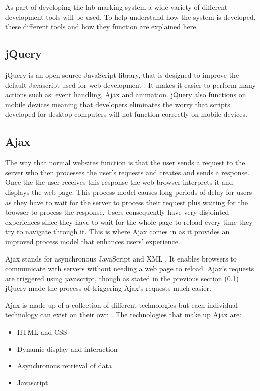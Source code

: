 \documentclass[11pt]{report}
\begin{document}
As part of developing the lab marking system  a wide variety of different development tools will be used. To help understand how the system is developed, these different tools and how they function are explained here.  



\subsection{jQuery} \label{sec:jquery}
jQuery is an open source JavaScript library, that is designed to improve the default Javascript used for web development \cite{jquery.org_jquery_????-1}. It makes it easier to perform many actions such as: event handling, Ajax and animation. jQuery also functions on mobile devices meaning that developers eliminates the worry that scripts developed for desktop computers will not function correctly on mobile devices.  

\subsection{Ajax}
The way that normal websites function is that the user sends a request to the server who then processes the user's requests and creates and sends a response. Once the the user receives this response the web browser interprets it and displays the web page\cite{smith_simplifying_2006-1}. This process model causes long periods of delay for users as they have to wait for the server to process their request plus waiting for the browser to process the response. Users consequently have very disjointed experiences since they have to wait for the whole page to reload every time they try to navigate through it. This is where Ajax comes in as it provides an improved process model that enhances users' experience.  

 Ajax stands for asynchronous JavaScript and XML \cite{jquery.org_ajax_????}. It enables browsers to communicate with servers without needing a web page to reload. Ajax's requests are triggered using javascript, though as stated in the previous section (\ref{sec:jquery}) jQuery made the process of triggering Ajax's requests much easier.  
 
 Ajax is made up of a collection of different technologies but each individual technology can exist on their own \cite{garrett_ajax:_2005}. The technologies that make up Ajax are:
 
 \begin{itemize}
 \item HTML and CSS
 \item Dynamic display and interaction
 \item Asynchronous retrieval of data
 \item Javascript
 \end{itemize}
\end{document}
